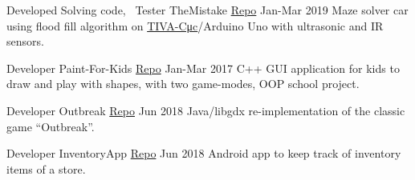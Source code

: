 \begin{cventries}
    \cventry
    {Developed Solving code, ~Tester} %
    {TheMistake \tiny{\href{https://www.github.com/Abdulrahman-Khalid/mazeSolver}{Repo}}} %
    {} %
    {Jan-Mar 2019} %
    {
      {Maze solver ​car using flood fill algorithm on \href{http://www.ti.com/tool/EK-TM4C123GXL}{​TIVA-C ​μc}​/Arduino Uno with ultrasonic and IR sensors.}
    }

  \cventry
    {Developer} %
    {Paint-For-Kids \tiny{\href{https://github.com/mido3ds/paint-for-kids}{Repo}}} %
    {} %
    {Jan-Mar 2017} %
    {
      {C++ ​GUI​ application for kids to ​ draw​ and play with shapes, with ​two game-modes​, OOP school project.}
    }

  \cventry
    {Developer} %
    {Outbreak \tiny{\href{https://github.com/mido3ds/Outbreak}{Repo}}} %
    {} %
    {Jun 2018} %
    {
      {Java​/libgdx re-implementation of the classic ​game​ ``Outbreak”.}
    }

  \cventry
    {Developer} %
    {InventoryApp \tiny{\href{https://github.com/mido3ds/InventoryApp}{Repo}}} %
    {} %
    {Jun 2018} %
    {
      Android​ app to keep track of inventory ​items of a store​.
    }

\end{cventries}
